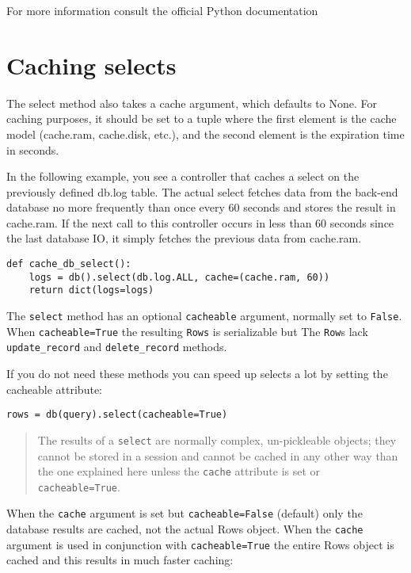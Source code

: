 \documentclass[justified,sixbynine,notoc]{tufte-book}
\def\ft{\small\tt}
\def\inxx#1{\index{#1}}
\begin{document}
\begin{fullwidth}
For more information consult the official Python documentation~\cite{quoteall}

\goodbreak\section{Caching selects}

The select method also takes a cache argument, which defaults to None. For caching purposes, it should be set to a tuple where the first element is the cache model (cache.ram, cache.disk, etc.), and the second element is the expiration time in seconds.

In the following example, you see a controller that caches a select on the previously defined db.log table. The actual select fetches data from the back-end database no more frequently than once every 60 seconds and stores the result in cache.ram. If the next call to this controller occurs in less than 60 seconds since the last database IO, it simply fetches the previous data from cache.ram.

\inxx{cache select}
\begin{lstlisting}
def cache_db_select():
    logs = db().select(db.log.ALL, cache=(cache.ram, 60))
    return dict(logs=logs)
\end{lstlisting}

\inxx{cacheable}

The {\ft select} method has an optional {\ft cacheable} argument, normally set to {\ft False}. When {\ft cacheable=True} the resulting {\ft Rows} is serializable but The {\ft Row}s lack {\ft update\_record} and {\ft delete\_record} methods.

If you do not need these methods you can speed up selects a lot by setting the cacheable attribute:

\begin{lstlisting}
rows = db(query).select(cacheable=True)
\end{lstlisting}

\begin{quote}The results of a {\ft select} are normally complex, un-pickleable objects; they cannot be stored in a session and cannot be cached in any other way than the one explained here unless the {\ft cache} attribute is set or {\ft cacheable=True}.\end{quote}
When the {\ft cache} argument is set but {\ft cacheable=False} (default) only the database results are cached, not the actual Rows object. When the {\ft cache} argument is used in conjunction with {\ft cacheable=True} the entire Rows object is cached and this results in much faster caching:


\end{fullwidth}
\end{document}
